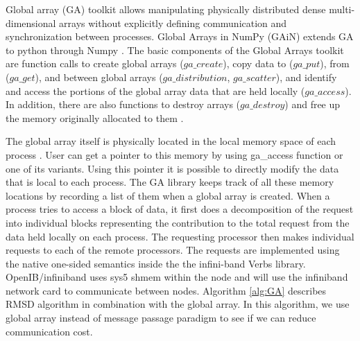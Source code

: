Global array (GA) toolkit allows manipulating physically distributed dense multi-dimensional arrays without explicitly defining communication and synchronization between processes.
Global Arrays in NumPy (GAiN) extends GA to python through Numpy \cite{GAiN}. 
The basic components of the Global Arrays toolkit are function calls to create global arrays ($ga\_create$), copy data to ($ga\_put$), from ($ga\_get$), and between global arrays ($ga\_distribution$, $ga\_scatter$), and identify and access the portions of the global array data that are held locally ($ga\_access$). 
In addition, there are also functions to destroy arrays ($ga\_destroy$) and free up the memory originally allocated to them \cite{GAiN}.

The global array itself is physically located in the local memory space of each process \cite{GA}. 
User can get a pointer to this memory by using ga\_access function or one of its variants.
Using this pointer it is possible to directly modify the data that is local to each process.
The GA library keeps track of all these memory locations by recording a list of them when a global array is created. 
When a process tries to access a block of data, it first does a decomposition of the request into individual blocks representing the contribution to the total request from the data held locally on each process\cite{PNNL:2017}. 
The requesting processor then makes individual requests to each of the remote processors. 
The requests are implemented using the native one-sided semantics inside the the infini-band Verbs library. 
OpenIB/infiniband uses sys5 shmem within the node and will use the infiniband network card to communicate between nodes.
Algorithm \ref{alg:GA} describes RMSD algorithm in combination with the global array.
In this algorithm, we use global array instead of message passage paradigm to see if we can reduce communication cost. 


